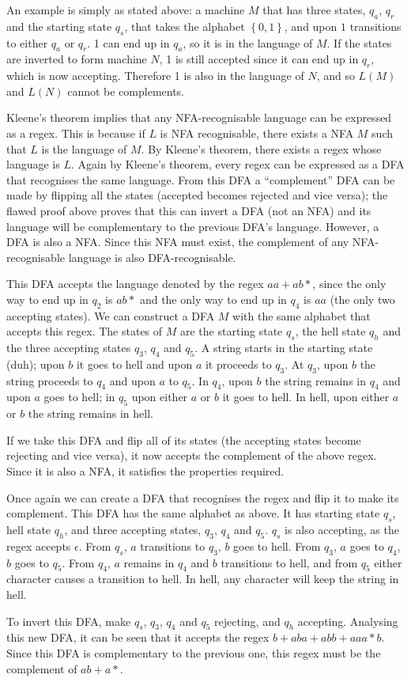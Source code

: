 An example is simply as stated above: a machine $M$ that has three states, $q_a$, $q_r$ and the starting state $q_s$, that takes the alphabet $\left\{0, 1\right\}$, and upon $1$ transitions to either $q_a$ or $q_r$. 1 can end up in $q_a$, so it is in the language of $M$. If the states are inverted to form machine $N$, 1 is still accepted since it can end up in $q_r$, which is now accepting. Therefore 1 is also in the language of $N$, and so $L(M)$ and $L(N)$ cannot be complements.

Kleene's theorem implies that any NFA-recognisable language can be expressed as a regex. This is because if $L$ is NFA recognisable, there exists a NFA $M$ such that $L$ is the language of $M$. By Kleene's theorem, there exists a regex whose language is $L$. Again by Kleene's theorem, every regex can be expressed as a DFA that recognises the same language. From this DFA a ``complement'' DFA can be made by flipping all the states (accepted becomes rejected and vice versa); the flawed proof above proves that this can invert a DFA (not an NFA) and its language will be complementary to the previous DFA's language. However, a DFA is also a NFA. Since this NFA must exist, the complement of any NFA-recognisable language is also DFA-recognisable.

This DFA accepts the language denoted by the regex $aa + ab*$, since the only way to end up in $q_2$ is $ab*$ and the only way to end up in $q_4$ is $aa$ (the only two accepting states). We can construct a DFA $M$ with the same alphabet that accepts this regex. The states of $M$ are the starting state $q_s$, the hell state $q_h$ and the three accepting states $q_3$, $q_4$ and $q_5$. A string starts in the starting state (duh); upon $b$ it goes to hell and upon $a$ it proceeds to $q_3$. At $q_3$, upon $b$ the string proceeds to $q_4$ and upon $a$ to $q_5$. In $q_4$, upon $b$ the string remains in $q_4$ and upon $a$ goes to hell; in $q_5$ upon either $a$ or $b$ it goes to hell. In hell, upon either $a$ or $b$ the string remains in hell.

If we take this DFA and flip all of its states (the accepting states become rejecting and vice versa), it now accepts the complement of the above regex. Since it is also a NFA, it satisfies the properties required.

Once again we can create a DFA that recognises the regex and flip it to make its complement. This DFA has the same alphabet as above. It has starting state $q_s$, hell state $q_h$, and three accepting states, $q_3$, $q_4$ and $q_5$. $q_s$ is also accepting, as the regex accepts $\epsilon$. From $q_s$, $a$ transitions to $q_3$, $b$ goes to hell. From $q_3$, $a$ goes to $q_4$, $b$ goes to $q_5$. From $q_4$, $a$ remains in $q_4$ and $b$ transitions to hell, and from $q_5$ either character causes a transition to hell. In hell, any character will keep the string in hell.

To invert this DFA, make $q_s$, $q_3$, $q_4$ and $q_5$ rejecting, and $q_h$ accepting. Analysing this new DFA, it can be seen that it accepts the regex $b + aba + abb + aaa*b$. Since this DFA is complementary to the previous one, this regex must be the complement of $ab + a*$.

